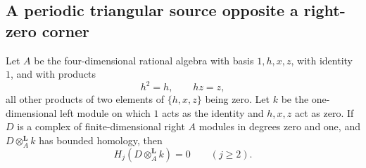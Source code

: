 \subsection{A periodic triangular source opposite a right-zero corner}

\begin{lemma}
\label{CP2:A-triangular-loop-two-term-amplitude}
Let $A$ be the four-dimensional rational algebra with basis
$1,h,x,z$, with identity $1$, and with products
\[
 h^2=h,\qquad hz=z,
\]
all other products of two elements of $\{h,x,z\}$ being zero.
Let $k$ be the one-dimensional left module on which $1$ acts as
the identity and $h,x,z$ act as zero.  If $D$ is a complex of
finite-dimensional right $A$ modules in degrees zero and one,
and $D\otimes_A^{\mathbf L}k$ has bounded homology, then
\[
 H_j(D\otimes_A^{\mathbf L}k)=0\qquad(j\ge2).
\]
\end{lemma}
